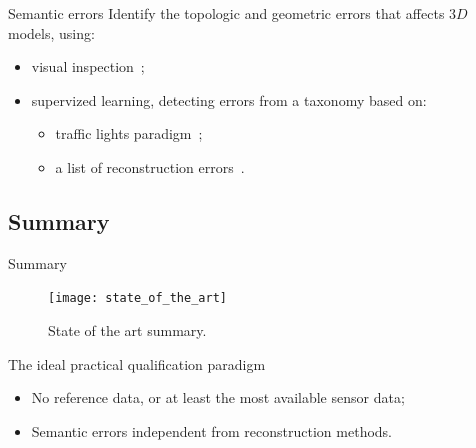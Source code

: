 \documentclass{beamer}
\begin{document}
            \begin{frame}{Semantic errors}
                Identify the topologic and geometric errors that affects $3D$ models, using:
                \begin{itemize}[label=$\blacktriangleright$, font=\color{IGNGreen}]
                    \item<1-> visual inspection~\citep{OudeElberink2010};
                    \item<2-> supervized learning, detecting errors from a taxonomy based on:
                    \begin{itemize}[label=--]
                        \item<3-> traffic lights paradigm~\citep{boudet2006supervised};
                        \item<4-> a list of reconstruction errors~\citep{Michelin2013}.
                    \end{itemize}
                \end{itemize}
            \end{frame}
        \subsection{Summary}
            \begin{frame}[plain]{Summary}
                \begin{figure}
                    \texttt{[image: state\_of\_the\_art]}
                    \caption{\label{fig::bib_summary} State of the art summary.}
                \end{figure}
            \end{frame}
            \begin{frame}{The ideal practical qualification paradigm}
                \begin{itemize}[label=$\blacktriangleright$, font=\color{IGNGreen}, itemsep=2em]
                    \item<1-> No reference data, or at least the most available sensor data;
                    \item<2-> Semantic errors independent from reconstruction methods.
                \end{itemize}
            \end{frame}
\end{document}
